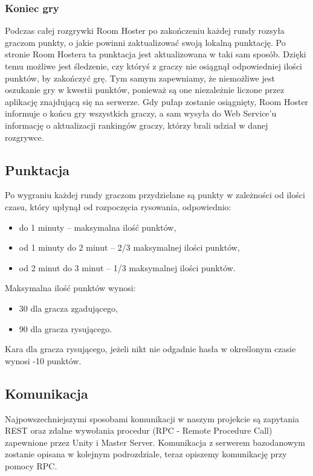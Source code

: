 \subsubsection{Koniec gry}
Podczas całej rozgrywki Room Hoster po zakończeniu każdej rundy rozsyła graczom punkty, o jakie powinni zaktualizować swoją lokalną punktację. Po stronie Room Hostera ta punktacja jest aktualizowana w taki sam sposób. Dzięki temu możliwe jest śledzenie, czy któryś z graczy nie osiągnął odpowiedniej ilości punktów, by zakończyć grę. Tym samym zapewniamy, że niemożliwe jest oszukanie gry w kwestii punktów, ponieważ są one niezależnie liczone przez aplikację znajdującą się na serwerze. Gdy pułap zostanie osiągnięty, Room Hoster informuje o końcu gry wszystkich graczy, a sam wysyła do Web Service'u informację o aktualizacji rankingów graczy, którzy brali udział w danej rozgrywce.

\subsection{Punktacja}
Po wygraniu każdej rundy graczom przydzielane są punkty w zależności od ilości czasu, który upłynął od rozpoczęcia rysowania, odpowiednio:
\begin{itemize}
    \item do 1 minuty – maksymalna ilość punktów,
    \item od 1 minuty do 2 minut – 2/3 maksymalnej ilości punktów,
    \item od 2 minut do 3 minut – 1/3 maksymalnej ilości punktów.
\end{itemize}
Maksymalna ilość punktów wynosi:
\begin{itemize}
    \item 30 dla gracza zgadującego,
    \item 90 dla gracza rysującego.
\end{itemize}
Kara dla gracza rysującego, jeżeli nikt nie odgadnie hasła w określonym czasie wynosi -10 punktów.

\subsection{Komunikacja}
Najpowszechniejszymi sposobami komunikacji w naszym projekcie są zapytania REST oraz zdalne wywołania procedur (RPC - Remote Procedure Call) zapewnione przez Unity i Master Server. 
Komunikacja z serwerem bazodanowym zostanie opisana w kolejnym podrozdziale, teraz opiszemy komunikację przy pomocy RPC.

